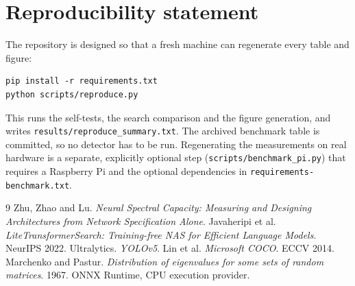 \documentclass[11pt,a4paper]{article}
\begin{document}
\section{Reproducibility statement}

The repository is designed so that a fresh machine can regenerate every table
and figure:

\begin{verbatim}
pip install -r requirements.txt
python scripts/reproduce.py
\end{verbatim}

This runs the self-tests, the search comparison and the figure generation, and
writes \texttt{results/reproduce\_summary.txt}. The archived benchmark table is
committed, so no detector has to be run. Regenerating the measurements on real
hardware is a separate, explicitly optional step
(\texttt{scripts/benchmark\_pi.py}) that requires a Raspberry Pi and the optional
dependencies in \texttt{requirements-benchmark.txt}.

\begin{thebibliography}{9}
\setlength{\itemsep}{0pt}
\small
{} Zhu, Zhao and Lu. \emph{Neural Spectral Capacity: Measuring and
Designing Architectures from Network Specification Alone}.
 Javaheripi et al. \emph{LiteTransformerSearch: Training-free NAS for
Efficient Language Models}. NeurIPS 2022.
 Ultralytics. \emph{YOLOv5}.
 Lin et al. \emph{Microsoft COCO}. ECCV 2014.
 Marchenko and Pastur. \emph{Distribution of eigenvalues for some sets
of random matrices}. 1967.
 ONNX Runtime, CPU execution provider.
\end{thebibliography}
\end{document}
